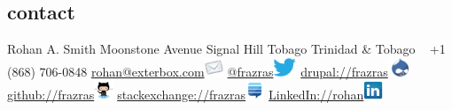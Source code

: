 \documentclass[]{friggeri-cv} %
\begin{document}


\begin{aside} %
\section{contact}
Rohan A. Smith
Moonstone Avenue
Signal Hill
Tobago
Trinidad \& Tobago
~
+1 (868) 706-0848
\href{mailto:rohan@exterbox.com}{rohan@exterbox.com}\includegraphics[height=16pt]{email.png}
\href{http://twitter.com/frazras}{@frazras}\includegraphics[height=16pt]{twitter.eps}
\href{http://drupal.org/user/34622}{drupal://frazras}\includegraphics[height=16pt]{druplicon.png}
\href {https://github.com/frazras}{github://frazras}\includegraphics[height=16pt]{octocat.png}
\href{http://stackexchange.com/users/530574/frazras?tab=accounts}{stackexchange://frazras}\includegraphics[height=16pt]{stackexchange.png}
\href {http://jm.linkedin.com/in/rohansmith}{LinkedIn://rohan}\includegraphics[height=16pt]{linkedin.png}

\end{aside}
\end{document}
